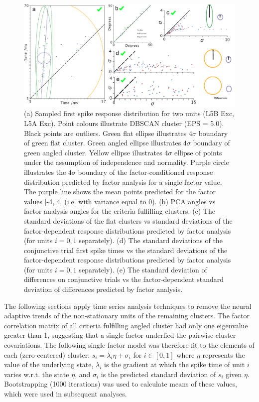 \documentclass{article}
\begin{document}
\begin{figure}[t!]
\centering
\includegraphics[width=\textwidth]{Figure5.pdf}
\caption{(a) Sampled first spike response distribution for two units (L5B Exc, L5A Exc). Point colours illustrate DBSCAN cluster (EPS = 5.0). Black points are outliers. Green flat ellipse illustrates $4\sigma$ boundary of green flat cluster. Green angled ellipse illustrates $4\sigma$ boundary of green angled cluster. Yellow ellipse illustrates $4\sigma$ ellipse of points under the assumption of independence and normality. Purple circle illustrates the $4\sigma$ boundary of the factor-conditioned response distribution predicted by factor analysis for a single factor value. The purple line shows the mean points predicted for the factor values [-4, 4] (i.e. with variance equal to 0). (b) PCA angles vs factor analysis angles for the criteria fulfilling clusters. (c) The standard deviations of the flat clusters vs standard deviations of the factor-dependent response distributions predicted by factor analysis (for units $i = 0,1$ separately). (d) The standard deviations of the conjunctive trial first spike times vs the standard deviations of the factor-dependent response distributions predicted by factor analysis (for units $i = 0,1$ separately). (e) The standard deviation of differences on conjunctive trials vs the factor-dependent standard deviation of differences predicted by factor analysis.}
\label{fig:universe}
\end{figure}


 The following sections apply time series analysis techniques to remove the neural adaptive trends of the non-stationary units of the remaining clusters. The factor correlation matrix of all criteria fulfilling angled cluster had only one eigenvalue greater than 1, suggesting that a single factor underlied the pairwise cluster covariations. The following single factor model was therefore fit to the elements of each (zero-centered) cluster: $s_i = \lambda_i \eta + \sigma_i$ for $i \in [0, 1]$ 
where $\eta$ represents the value of the underlying state, 
$\lambda_i$ is the gradient at which the spike time of unit $i$ varies w.r.t. the state $\eta$, 
and $\sigma_i$ is the predicted standard deviation of $s_i$ given $\eta$. Bootstrapping (1000 iterations) was used to calculate means of these values, which were used in subsequent analyses.
\end{document}
